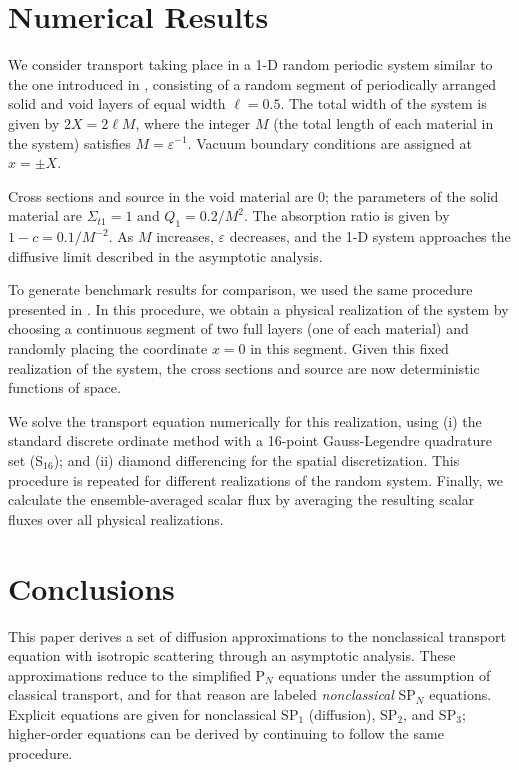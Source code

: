 \documentclass{anstrans}
\begin{document}
\section{Numerical Results}
We consider transport taking place in a 1-D random periodic system similar to the one introduced in \cite{zuc94}, consisting of a random segment of periodically arranged solid and void layers of equal width $\ell=0.5$.
The total width of the system is given by $2X = 2\ell M$, where the integer $M$ (the total length of each material in the system) satisfies $M = \varepsilon^{-1}$.
Vacuum boundary conditions are assigned at $x=\pm X$. 

Cross sections and source in the void material are 0; the parameters of the solid material are $\Sigma_{t1} = 1$ and $Q_1 = 0.2/M^2$.
The absorption ratio is given by $1-c = 0.1/M^{-2}$.
As $M$ increases, $\varepsilon$ decreases, and the 1-D system approaches the diffusive limit described in the asymptotic analysis.

To generate benchmark results for comparison, we used the same procedure presented in \cite{vas16}.
In this procedure, we obtain a physical realization of the system by choosing a continuous segment of two full layers (one of each material) and randomly placing the coordinate $x = 0$ in this segment.
Given this fixed realization of the system, the cross sections and source are now deterministic functions of space.

We solve the transport equation numerically for this realization, using (i) the standard discrete ordinate method with a 16-point Gauss-Legendre quadrature set (S$_{16}$); and (ii) diamond differencing for the spatial discretization.
This procedure is repeated for different realizations of the random system.
Finally, we calculate the ensemble-averaged scalar flux by averaging the resulting scalar fluxes over all physical realizations.

\section{Conclusions}
This paper derives a set of diffusion approximations to the nonclassical transport equation with isotropic scattering through an asymptotic analysis.
These approximations reduce to the simplified P$_N$ equations under the assumption of classical transport, and for that reason are labeled \textit{nonclassical} SP$_N$ equations.
Explicit equations are given for nonclassical SP$_1$ (diffusion), SP$_2$, and SP$_3$; higher-order equations can be derived by continuing to follow the same procedure.
\end{document}
